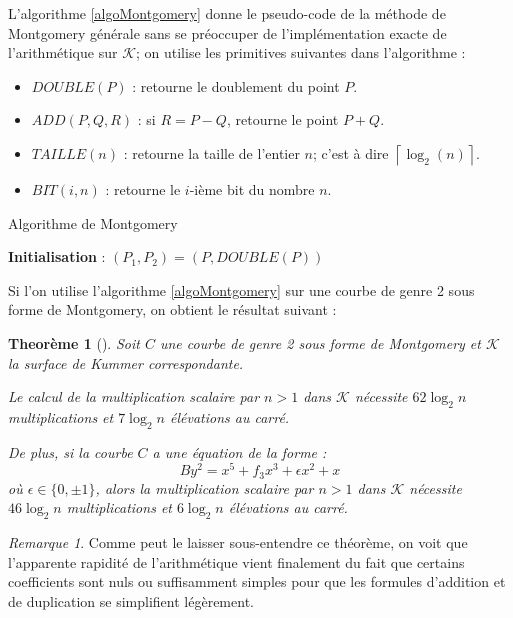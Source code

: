 \documentclass[a4paper,12pt]{article}
\newtheorem{theoreme}{Theorème}[section]
\theoremstyle{definition}
\theoremstyle{remark}
\newtheorem{remarque}{Remarque}
\numberwithin{equation}{section}
\begin{document}
L'algorithme \ref{algoMontgomery} donne le pseudo-code de la méthode de Montgomery générale sans se préoccuper de l'implémentation exacte de l'arithmétique sur $\mathcal{K}$; on utilise les primitives suivantes dans l'algorithme :
\begin{itemize}
\item $DOUBLE(P)$ : retourne le doublement du point $P$.
\item $ADD(P,Q,R)$ : si $R = P-Q$, retourne le point $P+Q$.
\item $TAILLE(n)$ : retourne la taille de l'entier $n$; c'est à dire $\left \lceil{\log_2(n)}\right \rceil$.
\item $BIT(i,n)$ : retourne le $i$-ième bit du nombre $n$.
\end{itemize}

\begin{algorithm}
\label{algoMontgomery}
\caption{Algorithme de Montgomery}
\textbf{Initialisation} : $(P_1,P_2) = (P,DOUBLE(P))$
\BlankLine
{}
\end{algorithm}

Si l'on utilise l'algorithme \ref{algoMontgomery} sur une courbe de genre 2 sous forme de Montgomery, on obtient le résultat suivant :
\begin{theoreme}[\citet{duquesne}]
\label{thduquesne}
Soit $C$ une courbe de genre 2 sous forme de Montgomery et $\mathcal{K}$ la surface de Kummer correspondante.

Le calcul de la multiplication scalaire par $n > 1$ dans $\mathcal{K}$ nécessite $62\log_2 n$ multiplications et $7\log_2 n$ élévations au carré.

De plus, si la courbe $C$ a une équation de la forme :
$$By^2 = x^5 + f_3 x^3 + \epsilon x^2 + x$$
où $\epsilon \in \{0,\pm 1\}$, alors la multiplication scalaire par $n > 1$ dans $\mathcal{K}$ nécessite $46\log_2 n$ multiplications et $6\log_2 n$ élévations au carré.
\end{theoreme}

\begin{remarque}
Comme peut le laisser sous-entendre ce théorème, on voit que l'apparente rapidité de l'arithmétique vient finalement du fait que certains coefficients sont nuls ou suffisamment simples pour que les formules d'addition et de duplication se simplifient légèrement.
\end{remarque}
\end{document}

